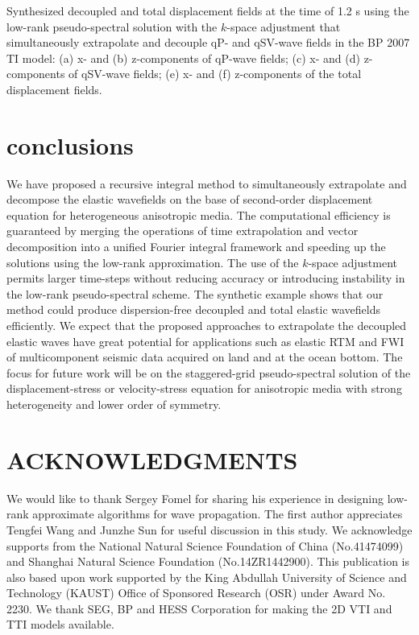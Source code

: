 {
 Synthesized decoupled and total displacement fields at the time of 1.2 s using the low-rank pseudo-spectral
 solution with the $k$-space adjustment that simultaneously extrapolate and decouple qP- and qSV-wave fields in the BP 2007 TI model:
  (a) x- and (b) z-components of qP-wave fields;
  (c) x- and (d) z-components of qSV-wave fields;
  (e) x- and (f) z-components of the total displacement fields.
}


\section{conclusions}
We have proposed a recursive integral method to simultaneously extrapolate and 
decompose the elastic wavefields on the base of second-order displacement equation for heterogeneous anisotropic media.
The computational efficiency is guaranteed by merging the operations of 
time extrapolation and vector decomposition into a unified Fourier integral
framework and speeding up the solutions using the low-rank approximation.
The use of the $k$-space adjustment permits larger time-steps without reducing accuracy
or introducing instability in the low-rank pseudo-spectral scheme.
The synthetic example shows that our method could produce dispersion-free decoupled
and total elastic wavefields efficiently.
We expect that the proposed approaches to extrapolate the decoupled elastic waves have great potential for applications such
as elastic RTM and FWI of multicomponent seismic data acquired on land and at the
ocean bottom.
The focus for future work will be on the staggered-grid pseudo-spectral solution of the displacement-stress or velocity-stress equation
	for anisotropic media with strong heterogeneity and lower order of symmetry.

\section{ACKNOWLEDGMENTS}
We would like to thank Sergey Fomel for sharing his experience in
designing low-rank approximate algorithms for wave propagation.
The first author appreciates Tengfei Wang and Junzhe Sun for useful discussion in this study.
We acknowledge supports from the National
Natural Science Foundation of China (No.41474099) and Shanghai Natural Science Foundation
(No.14ZR1442900).
This publication is also based upon work supported by
the King Abdullah University of Science and Technology (KAUST) Office of Sponsored Research (OSR) under Award No. 2230.
We thank SEG, BP and HESS Corporation for making the 2D VTI and TTI models available.

